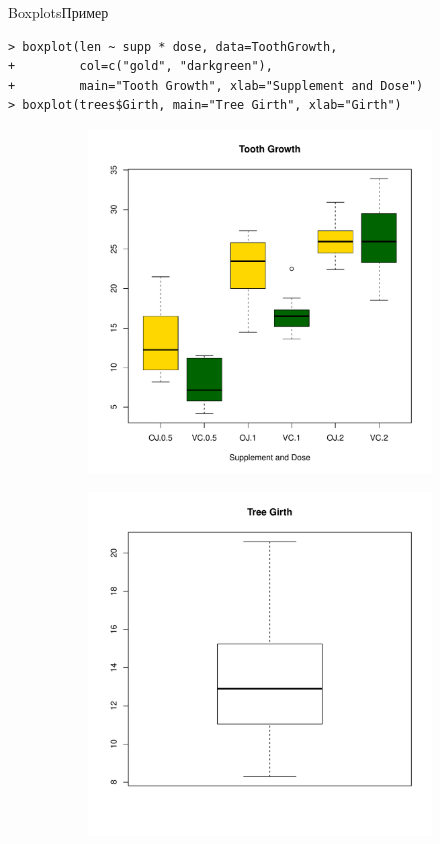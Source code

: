 \documentclass[hyperref={unicode}, xcolor={svgnames, table},
usepdftitle=false]{beamer}
\theoremstyle{remark}
\begin{document}
\begin{frame}[fragile]{Boxplots}{Пример}
\begin{verbatim}
> boxplot(len ~ supp * dose, data=ToothGrowth,
+         col=c("gold", "darkgreen"),
+         main="Tooth Growth", xlab="Supplement and Dose")
> boxplot(trees$Girth, main="Tree Girth", xlab="Girth")
\end{verbatim}
  \begin{figure}
    \centering
    \begin{subfigure}[b]{.45\linewidth}
      \includegraphics[width=\textwidth]{Boxplot_Tooth_Growth.pdf}
    \end{subfigure}
    \begin{subfigure}[b]{.45\linewidth}
      \includegraphics[width=\textwidth]{Boxplot_Tree_Girth.pdf}

\end{subfigure}
\end{figure}
\end{frame}
\end{document}
